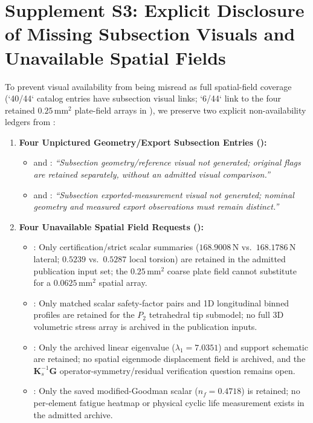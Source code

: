 \section*{Supplement S3: Explicit Disclosure of Missing Subsection Visuals and Unavailable Spatial Fields}
\label{sup:missing-disclosures}

To prevent visual availability from being misread as full spatial-field coverage (`40/44` catalog entries have subsection visual links; `6/44` link to the four retained $0.25\,\mathrm{mm}^2$ plate-field arrays in ), we preserve two explicit non-availability ledgers from :
\begin{enumerate}
  \item \textbf{Four Unpictured Geometry/Export Subsection Entries ():}
    \begin{itemize}
      \item {} and : \emph{``Subsection geometry/reference visual not generated; original flags are retained separately, without an admitted visual comparison.''}
      \item {} and : \emph{``Subsection exported-measurement visual not generated; nominal geometry and measured export observations must remain distinct.''}
    \end{itemize}
  \item \textbf{Four Unavailable Spatial Field Requests ():}
    \begin{itemize}
      \item {}: Only certification/strict scalar summaries ($168.9008\,\mathrm{N}$ vs.\ $168.1786\,\mathrm{N}$ lateral; $0.5239$ vs.\ $0.5287$ local torsion) are retained in the admitted publication input set; the $0.25\,\mathrm{mm}^2$ coarse plate field cannot substitute for a $0.0625\,\mathrm{mm}^2$ spatial array.
      \item {}: Only matched scalar safety-factor pairs and 1D longitudinal binned profiles are retained for the $P_2$ tetrahedral tip submodel; no full 3D volumetric stress array is archived in the publication inputs.
      \item {}: Only the archived linear eigenvalue ($\lambda_1 = 7.0351$) and support schematic are retained; no spatial eigenmode displacement field is archived, and the  $\mathbf{K}_s^{-1}\mathbf{G}$ operator-symmetry/residual verification question remains open.
      \item {}: Only the saved modified-Goodman scalar ($n_f = 0.4718$) is retained; no per-element fatigue heatmap or physical cyclic life measurement exists in the admitted archive.
    \end{itemize}
\end{enumerate}
